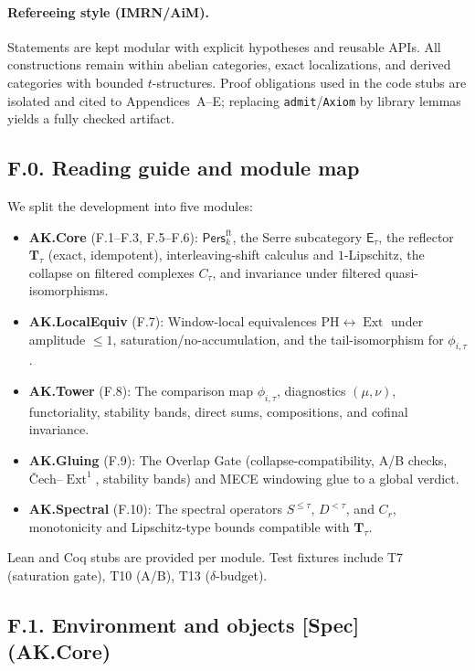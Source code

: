 \documentclass[11pt]{article}
\numberwithin{equation}{section}
\theoremstyle{plain}
\theoremstyle{definition}
\theoremstyle{remark}
\DeclareMathOperator{\Ext}{Ext}
\newcommand{\Pers}{\mathsf{Pers}}
\theoremstyle{plain}
\theoremstyle{definition}
\numberwithin{equation}{section}
\theoremstyle{definition}
\numberwithin{equation}{section}
\theoremstyle{plain}
\theoremstyle{definition}
\theoremstyle{remark}
\begin{document}
\paragraph{Refereeing style (IMRN/AiM).}
Statements are kept modular with explicit hypotheses and reusable APIs.
All constructions remain within abelian categories, exact localizations, and derived categories with bounded \(t\)-structures.
Proof obligations used in the code stubs are isolated and cited to Appendices~A–E; replacing \texttt{admit}/\texttt{Axiom} by library lemmas yields a fully checked artifact.

\subsection*{F.0. Reading guide and module map}

We split the development into five modules:

\begin{itemize}
  \item \textbf{AK.Core} (F.1–F.3, F.5–F.6): \(\Pers^{\mathrm{ft}}_k\), the Serre subcategory \(\mathsf{E}_\tau\), the reflector \(\mathbf{T}_\tau\) (exact, idempotent), interleaving-shift calculus and \(1\)-Lipschitz, the collapse on filtered complexes \(C_\tau\), and invariance under filtered quasi-isomorphisms.
  \item \textbf{AK.LocalEquiv} (F.7): Window-local equivalences \(\mathrm{PH}\leftrightarrow \Ext\) under amplitude \(\le 1\), saturation/no-accumulation, and the tail-isomorphism for \(\phi_{i,\tau}\).
  \item \textbf{AK.Tower} (F.8): The comparison map \(\phi_{i,\tau}\), diagnostics \((\mu,\nu)\), functoriality, stability bands, direct sums, compositions, and cofinal invariance.
  \item \textbf{AK.Gluing} (F.9): The Overlap Gate (collapse-compatibility, A/B checks, Čech–\(\Ext^1\), stability bands) and MECE windowing glue to a global verdict.
  \item \textbf{AK.Spectral} (F.10): The spectral operators \(S^{\le\tau}\), \(D^{<\tau}\), and \(C_r\), monotonicity and Lipschitz-type bounds compatible with \(\mathbf{T}_\tau\).
\end{itemize}

Lean and Coq stubs are provided per module. Test fixtures include T7 (saturation gate), T10 (A/B), T13 (\(\delta\)-budget).

\subsection*{F.1. Environment and objects [Spec] (AK.Core)}
\end{document}
